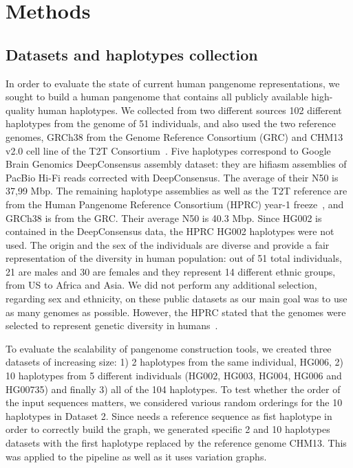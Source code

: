 \section{Methods}
\subsection*{\textbf{Datasets and haplotypes collection}}
\label{sec:datasets}
In order to evaluate the state of current human pangenome representations, we sought to build a human pangenome that contains all publicly available high-quality human haplotypes. We collected from two different sources 102 different haplotypes from the genome of 51 individuals, and also used the two reference genomes, GRCh38 from the Genome Reference Consortium (GRC) \cite{grc} and CHM13 v2.0 cell line of the T2T Consortium~\cite{t2t}.
Five haplotypes correspond to Google Brain Genomics DeepConsensus \cite{deepconsensus} assembly dataset: they are hifiasm assemblies of PacBio Hi-Fi reads corrected with DeepConsensus. The average of their N50 is 37,99 Mbp. 
The remaining haplotype assemblies as well as the T2T reference are from the Human Pangenome Reference Consortium (HPRC) year-1 freeze~\cite{hpp}, and GRCh38 is from the GRC. Their average N50 is 40.3 Mbp. Since HG002 is contained in the DeepConsensus data, the HPRC HG002 haplotypes were not used.
The origin and the sex of the individuals are diverse %
and provide a fair representation of the diversity in human population: out of 51 total individuals, 21 are males and 30 are females and they represent 14 different ethnic groups, from US to Africa and Asia. We did not perform any additional selection, regarding sex and ethnicity, on these public datasets as our main goal was to use as many genomes as possible. However, the HPRC stated that the genomes were selected to represent genetic diversity in humans~\mbox{\cite{hdpr}}.

To evaluate the scalability of pangenome construction tools, we created three datasets of increasing size: 1) 2 haplotypes from the same individual, HG006, 2) 10 haplotypes from 5 different individuals (HG002, HG003, HG004, HG006 and HG00735) and finally 3) all of the 104 haplotypes. To test whether the order of the input sequences matters, we considered various random orderings for the 10 haplotypes in Dataset 2. Since \minigraph needs a reference sequence as fist haplotype in order to correctly build the graph, we generated specific 2 and 10 haplotypes datasets with the first haplotype replaced by the reference genome CHM13. This was applied to the \mcactus pipeline as well as it uses \minigraph variation graphs.


